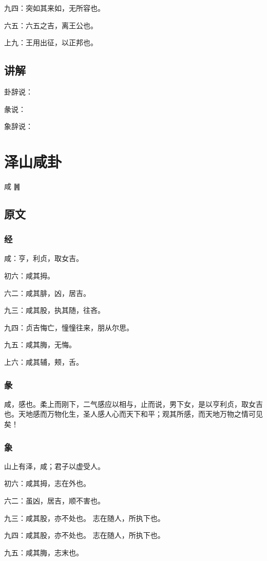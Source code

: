 \documentclass[12pt,oneside]{book}
\begin{document}
九四：突如其来如，无所容也。

六五：六五之吉，离王公也。

上九：王用出征，以正邦也。

\section{讲解}
卦辞说：

彖说：

象辞说：

\chapter{泽山咸卦}
咸 {\Large ䷞}

\section{原文}

\subsection{经}
咸：亨，利贞，取女吉。

初六：咸其拇。

六二：咸其腓，凶，居吉。

九三：咸其股，执其随，往吝。

九四：贞吉悔亡，憧憧往来，朋从尔思。

九五：咸其脢，无悔。

上六：咸其辅，颊，舌。

\subsection{彖}
咸，感也。柔上而刚下，二气感应以相与，止而说，男下女，是以亨利贞，取女吉也。天地感而万物化生，圣人感人心而天下和平；观其所感，而天地万物之情可见矣！

\subsection{象}
山上有泽，咸；君子以虚受人。

初六：咸其拇，志在外也。

六二：虽凶，居吉，顺不害也。

九三：咸其股，亦不处也。 志在随人，所执下也。

九四：咸其股，亦不处也。 志在随人，所执下也。

九五：咸其脢，志末也。
\end{document}
